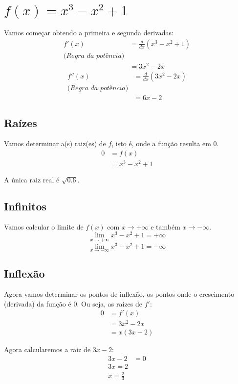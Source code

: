 \documentclass[12pt]{article}
\theoremstyle{definition}
\begin{document}
\section{\(f(x)=x^3-x^2+1\)}
Vamos começar obtendo a primeira e segunda derivadas:
\begin{align*}
    f'(x)
    &= \frac{d}{dx} (x^3-x^2+1) \\
    \textit{(Regra da potência)} \\
    &= 3x^2 - 2x
\end{align*}
\begin{align*}
    f''(x)
    &= \frac{d}{dx} (3x^2 - 2x) \\
    \textit{(Regra da potência)} \\
    &= 6x - 2
\end{align*}
\subsection{Raízes}
Vamos determinar a(s) raiz(es) de \(f\), isto é, onde a função resulta em 0.%
\begin{align*}
    0 &= f(x) \\
      &= x^3-x^2+1 
\end{align*}

A única raiz real é \(\sqrt{0.6}\).
\subsection{Infinitos}
Vamos calcular o limite de \(f(x)\) com \(x\rightarrow +\infty\) e também \(x\rightarrow -\infty\).
\[
    \lim_{x\rightarrow +\infty}{x^3-x^2+1} = +\infty
\]
\[
    \lim_{x\rightarrow -\infty}{x^3-x^2+1} = -\infty
\]
\subsection{Inflexão}
Agora vamos determinar os pontos de inflexão, os pontos onde o crescimento (derivada) da função é 0. Ou seja, as raízes de \(f'\):
\begin{align*}
    0 &= f'(x) \\
      &= 3x^2-2x \\
      &= x(3x-2)
\end{align*}

Agora calcularemos a raiz de \(3x-2\):
\begin{align*}
    3x - 2 &= 0 \\
    3x = 2 \\
    x = \frac{2}{3}
\end{align*}
\end{document}
